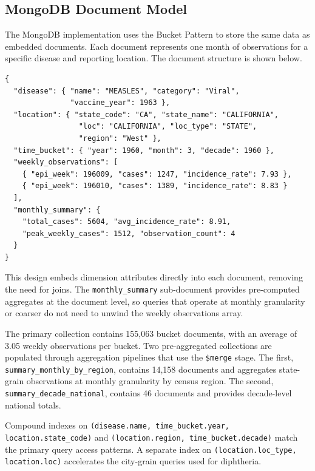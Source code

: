 \documentclass[12pt,a4paper]{article}
\begin{document}
\subsection{MongoDB Document Model}

The MongoDB implementation uses the Bucket Pattern to store the same data as embedded documents. Each document represents one month of observations for a specific disease and reporting location. The document structure is shown below.

\begin{lstlisting}[language={}, caption={MongoDB bucket document structure (simplified).}, label={lst:mongodoc}]
{
  "disease": { "name": "MEASLES", "category": "Viral",
               "vaccine_year": 1963 },
  "location": { "state_code": "CA", "state_name": "CALIFORNIA",
                 "loc": "CALIFORNIA", "loc_type": "STATE",
                 "region": "West" },
  "time_bucket": { "year": 1960, "month": 3, "decade": 1960 },
  "weekly_observations": [
    { "epi_week": 196009, "cases": 1247, "incidence_rate": 7.93 },
    { "epi_week": 196010, "cases": 1389, "incidence_rate": 8.83 }
  ],
  "monthly_summary": {
    "total_cases": 5604, "avg_incidence_rate": 8.91,
    "peak_weekly_cases": 1512, "observation_count": 4
  }
}
\end{lstlisting}

This design embeds dimension attributes directly into each document, removing the need for joins. The \texttt{monthly\_summary} sub-document provides pre-computed aggregates at the document level, so queries that operate at monthly granularity or coarser do not need to unwind the weekly observations array.

The primary collection contains 155{,}063 bucket documents, with an average of 3.05 weekly observations per bucket. Two pre-aggregated collections are populated through aggregation pipelines that use the \texttt{\$merge} stage. The first, \texttt{summary\_monthly\_by\_region}, contains 14{,}158 documents and aggregates state-grain observations at monthly granularity by census region. The second, \texttt{summary\_decade\_national}, contains 46 documents and provides decade-level national totals.

Compound indexes on \texttt{(disease.name, time\_bucket.year, location.state\_code)} and \texttt{(location.region, time\_bucket.decade)} match the primary query access patterns. A separate index on \texttt{(location.loc\_type, location.loc)} accelerates the city-grain queries used for diphtheria.
\end{document}
